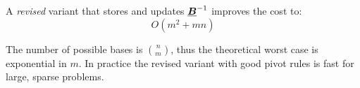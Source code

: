 A \emph{revised} variant that stores and updates \(\underline{\boldsymbol{B}}^{-1}\) improves the cost to:
\[
  O(m^{2}+mn)
\]

The number of possible bases is \(\binom{n}{m}\), thus the theoretical
worst case is exponential in \(m\).  
In practice the revised variant with good pivot rules is fast for large,
sparse problems.
























